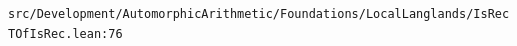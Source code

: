 \nolinkurl{src/Development/AutomorphicArithmetic/Foundations/LocalLanglands/IsRecTOfIsRec.lean:76}%
